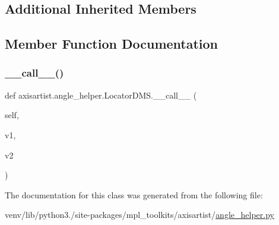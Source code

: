 \subsection*{Additional Inherited Members}


\subsection{Member Function Documentation}
\mbox{\label{classaxisartist_1_1angle__helper_1_1LocatorDMS_aa79e493df4ee64107ef11f809aaa600e}} 
\subsubsection{\texorpdfstring{\+\_\+\+\_\+call\+\_\+\+\_\+()}{\_\_call\_\_()}}
{\footnotesize\ttfamily def axisartist.\+angle\+\_\+helper.\+Locator\+D\+M\+S.\+\_\+\+\_\+call\+\_\+\+\_\+ (\begin{DoxyParamCaption}\item[{}]{self,  }\item[{}]{v1,  }\item[{}]{v2 }\end{DoxyParamCaption})}



The documentation for this class was generated from the following file\+:\begin{DoxyCompactItemize}
\item 
venv/lib/python3./site-\/packages/mpl\+\_\+toolkits/axisartist/\hyperlink{axisartist_2angle__helper_8py}{angle\+\_\+helper.\+py}\end{DoxyCompactItemize}
